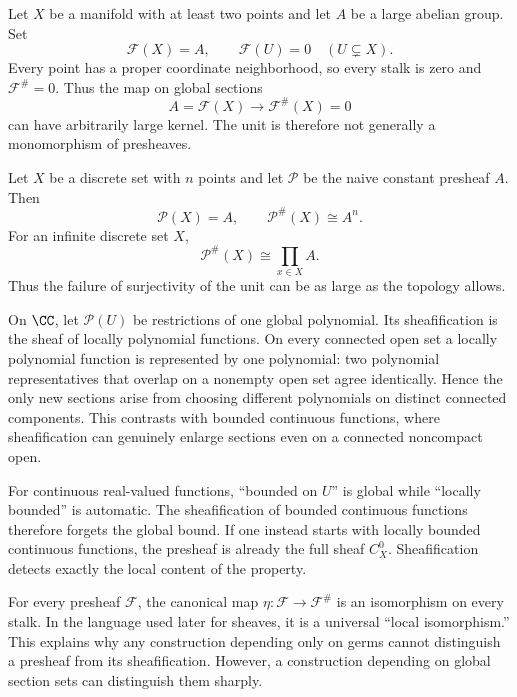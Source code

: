 \begin{example}
Let $X$ be a manifold with at least two points and let $A$ be a large abelian group.  Set
\[
\mathcal F(X)=A,\qquad \mathcal F(U)=0\quad(U\subsetneq X).
\]
Every point has a proper coordinate neighborhood, so every stalk is zero and
$\mathcal F^\#=0$.  Thus the map on global sections
\[
A=\mathcal F(X)\longrightarrow\mathcal F^\#(X)=0
\]
can have arbitrarily large kernel.  The unit is therefore not generally a monomorphism of
presheaves.
\end{example}

\begin{example}
Let $X$ be a discrete set with $n$ points and let $\mathcal P$ be the naive constant
presheaf $A$.  Then
\[
\mathcal P(X)=A,
\qquad
\mathcal P^\#(X)\cong A^n.
\]
For an infinite discrete set $X$,
\[
\mathcal P^\#(X)\cong\prod_{x\in X}A.
\]
Thus the failure of surjectivity of the unit can be as large as the topology allows.
\end{example}

\begin{example}
On $\CC$, let $\mathcal P(U)$ be restrictions of one global polynomial.  Its sheafification
is the sheaf of locally polynomial functions.  On every connected open set a locally
polynomial function is represented by one polynomial: two polynomial representatives that
overlap on a nonempty open set agree identically.  Hence the only new sections arise from
choosing different polynomials on distinct connected components.  This contrasts with
bounded continuous functions, where sheafification can genuinely enlarge sections even on a
connected noncompact open.
\end{example}

\begin{example}
For continuous real-valued functions, ``bounded on $U$'' is global while ``locally bounded''
is automatic.  The sheafification of bounded continuous functions therefore forgets the
global bound.  If one instead starts with locally bounded continuous functions, the presheaf
is already the full sheaf $C^0_X$.  Sheafification detects exactly the local content of the
property.
\end{example}

\begin{example}
For every presheaf $\mathcal F$, the canonical map
$\eta:\mathcal F\to\mathcal F^\#$ is an isomorphism on every stalk.  In the language used
later for sheaves, it is a universal ``local isomorphism.''  This explains why any
construction depending only on germs cannot distinguish a presheaf from its sheafification.
However, a construction depending on global section sets can distinguish them sharply.
\end{example}

